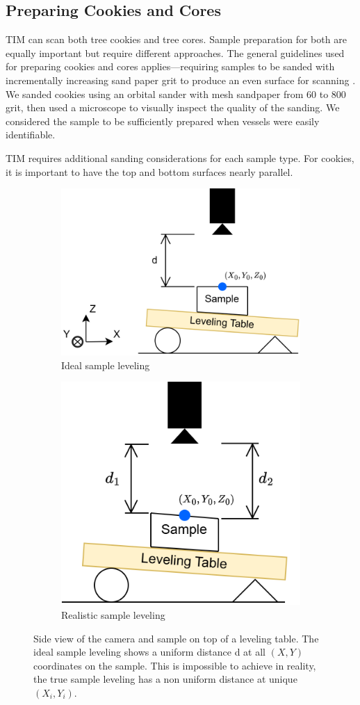 \documentclass[a4paper,12pt]{article}
\begin{document}
\subsection{Preparing Cookies and Cores}
TIM can scan both tree cookies and tree cores. Sample preparation for both are equally important but require different approaches.
The general guidelines used for preparing cookies and cores applies---requiring samples to be sanded with incrementally increasing sand paper grit to produce an even surface for scanning \citep{speer_fundamentals_2010}. We sanded cookies using an orbital sander with mesh sandpaper from 60 to 800 grit, then used a microscope to visually inspect the quality of the sanding. We considered the sample to be sufficiently prepared when vessels were easily identifiable.

TIM requires additional sanding considerations for each sample type. 
For cookies, it is important to have the top and bottom surfaces nearly parallel. 
\begin{figure}
  \centering
  \begin{subfigure}{.5\textwidth}
    \centering
    \includegraphics[height=0.5\linewidth]{../diagrams/sample_setup_ideal.png}
    \caption{Ideal sample leveling}
    \label{fig:ideal_levelling}
  \end{subfigure}%
  \begin{subfigure}{.5\textwidth}
    \centering
    \includegraphics[height=0.5\linewidth]{../diagrams/sample_setup_realistic.png}
    \caption{Realistic sample leveling}
    \label{fig:realistic_levelling}
  \end{subfigure}
  \caption{Side view of the camera and sample on top of a leveling table. The ideal sample leveling shows a uniform distance d at all $(X,Y)$ coordinates on the sample. This is impossible to achieve in reality, the true sample leveling has a non uniform distance at unique $(X_i, Y_i)$.}
  \label{fig:sample_levelling}
\end{figure}
\end{document}
